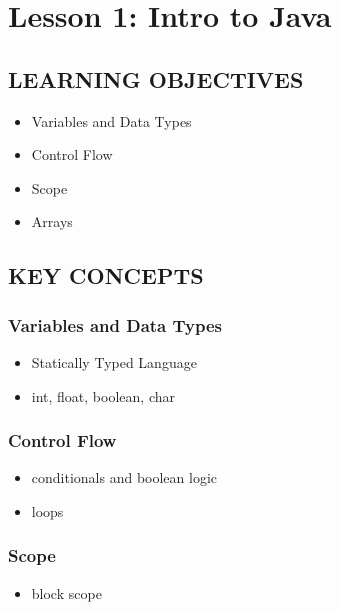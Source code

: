 \documentclass[14pt]{extreport}%
\begin{document}
\setcounter{chapter}{0}
\chapter{\Large{\textbf{Lesson 1}: Intro to Java}}

\vspace{-10pt}

\section*{LEARNING OBJECTIVES}
\begin{itemize}
    \item Variables and Data Types \item Control Flow \item Scope \item Arrays
    
\end{itemize}

\section*{KEY CONCEPTS}
\subsection*{Variables and Data Types}
\begin{itemize}
    \item Statically Typed Language
    \item int, float, boolean, char 
\end{itemize}

\subsection*{Control Flow }
\begin{itemize}
    \item conditionals and boolean logic 
    \item loops
\end{itemize}

\subsection*{Scope}
\begin{itemize}
    \item block scope
    

    
\end{itemize}
\end{document}
